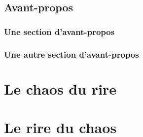 \documentclass[12pt,space=onehalf]{yathesis}
\begin{document}
\chapter{Avant-propos}
\section{Une section d'avant-propos}
\lipsum[30-45]
\section{Une autre section d'avant-propos}
\lipsum[30-35]
%
\tableofcontents[depth=chapter,name=Sommaire]
%
\listoftables
%
\listoffigures
%
%
\mainmatter
%

%
%
\part{Le chaos du rire}



%
\part{Le rire du chaos}



%

%
\printbibliography
%
\appendix
%


%
\backmatter
%
\printglossary
%
\printindex
%
\tableofcontents
%
\makebackcover
%
\end{document}
